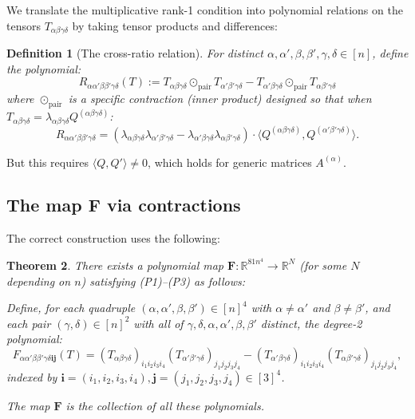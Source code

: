 \documentclass[12pt]{article}
\newtheorem{theorem}{Theorem}
\newtheorem{definition}[theorem]{Definition}
\begin{document}
We translate the multiplicative rank-1 condition into polynomial relations on the tensors $T_{\alpha\beta\gamma\delta}$ by taking tensor products and differences:

\begin{definition}[The cross-ratio relation]\label{def:cross-ratio}
For distinct $\alpha, \alpha', \beta, \beta', \gamma, \delta \in [n]$, define the polynomial:
\[
R_{\alpha\alpha'\beta\beta'\gamma\delta}(T) := T_{\alpha\beta\gamma\delta} \odot_{\text{pair}} T_{\alpha'\beta'\gamma\delta} - T_{\alpha'\beta\gamma\delta} \odot_{\text{pair}} T_{\alpha\beta'\gamma\delta}
\]
where $\odot_{\text{pair}}$ is a specific contraction (inner product) designed so that when $T_{\alpha\beta\gamma\delta} = \lambda_{\alpha\beta\gamma\delta} Q^{(\alpha\beta\gamma\delta)}$:
\[
R_{\alpha\alpha'\beta\beta'\gamma\delta} = (\lambda_{\alpha\beta\gamma\delta}\lambda_{\alpha'\beta'\gamma\delta} - \lambda_{\alpha'\beta\gamma\delta}\lambda_{\alpha\beta'\gamma\delta}) \cdot \langle Q^{(\alpha\beta\gamma\delta)}, Q^{(\alpha'\beta'\gamma\delta)}\rangle.
\]
\end{definition}

But this requires $\langle Q, Q' \rangle \neq 0$, which holds for generic matrices $A^{(\alpha)}$.

\subsection{The map $\mathbf{F}$ via contractions}

The correct construction uses the following:

\begin{theorem}\label{thm:main}
There exists a polynomial map $\mathbf{F}: \mathbb{R}^{81n^4} \to \mathbb{R}^N$ (for some $N$ depending on $n$) satisfying (P1)--(P3) as follows:

Define, for each quadruple $(\alpha,\alpha',\beta,\beta') \in [n]^4$ with $\alpha \neq \alpha'$ and $\beta \neq \beta'$, and each pair $(\gamma,\delta) \in [n]^2$ with all of $\gamma, \delta, \alpha, \alpha', \beta, \beta'$ distinct, the degree-2 polynomial:
\begin{equation}\label{eq:F-component}
F_{\alpha\alpha'\beta\beta'\gamma\delta\mathbf{i}\mathbf{j}}(T) = (T_{\alpha\beta\gamma\delta})_{i_1 i_2 i_3 i_4} (T_{\alpha'\beta'\gamma\delta})_{j_1 j_2 j_3 j_4} - (T_{\alpha'\beta\gamma\delta})_{i_1 i_2 i_3 i_4} (T_{\alpha\beta'\gamma\delta})_{j_1 j_2 j_3 j_4},
\end{equation}
indexed by $\mathbf{i} = (i_1,i_2,i_3,i_4), \mathbf{j} = (j_1,j_2,j_3,j_4) \in [3]^4$.

The map $\mathbf{F}$ is the collection of all these polynomials.
\end{theorem}
\end{document}
